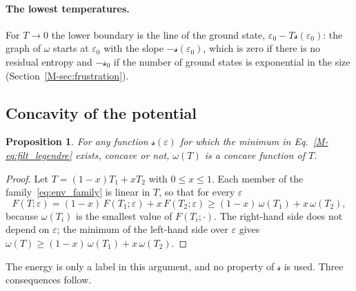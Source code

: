 \documentclass[10pt,a4paper]{article}
\theoremstyle{plain}
\newtheorem{proposition}{Proposition}
\theoremstyle{remark}
\newcommand{\lds}{\mathscr{s}}  %
\begin{document}
\paragraph{The lowest temperatures.} For $T\to0$ the lower boundary is the
line of the ground state, $\varepsilon_0-T\lds(\varepsilon_0)$: the graph of
$\omega$ starts at $\varepsilon_0$ with the slope $-\lds(\varepsilon_0)$,
which is zero if there is no residual entropy and $-\lds_0$ if the number of
ground states is exponential in the size
(Section~\ref{M-sec:frustration}).

\subsection{Concavity of the potential}
\label{sec:env_concave}

\begin{proposition}\label{prop:env_concave}
For any function $\lds(\varepsilon)$ for which the minimum in
Eq.~\eqref{M-eq:filt_legendre} exists, concave or not, $\omega(T)$ is a
concave function of $T$.
\end{proposition}
\begin{proof}
Let $T=(1-x)T_1+xT_2$ with $0\le x\le1$. Each member of the
family~\eqref{eq:env_family} is linear in $T$, so that for every
$\varepsilon$
\[
  F(T;\varepsilon)=(1-x)\,F(T_1;\varepsilon)+x\,F(T_2;\varepsilon)
  \ge(1-x)\,\omega(T_1)+x\,\omega(T_2) ,
\]
because $\omega(T_i)$ is the smallest value of $F(T_i;\cdot)$. The
right-hand side does not depend on $\varepsilon$; the minimum of the
left-hand side over $\varepsilon$ gives
$\omega(T)\ge(1-x)\,\omega(T_1)+x\,\omega(T_2)$.
\end{proof}
The energy is only a label in this argument, and no property of $\lds$ is
used. Three consequences follow.
\end{document}
